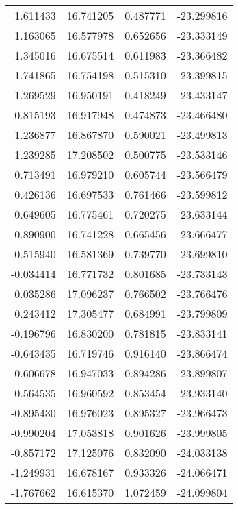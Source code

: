 \begin{tabular}{rrrr}
        1.611433 &        16.741205 &    0.487771 & -23.299816 \\
        1.163065 &        16.577978 &    0.652656 & -23.333149 \\
        1.345016 &        16.675514 &    0.611983 & -23.366482 \\
        1.741865 &        16.754198 &    0.515310 & -23.399815 \\
        1.269529 &        16.950191 &    0.418249 & -23.433147 \\
        0.815193 &        16.917948 &    0.474873 & -23.466480 \\
        1.236877 &        16.867870 &    0.590021 & -23.499813 \\
        1.239285 &        17.208502 &    0.500775 & -23.533146 \\
        0.713491 &        16.979210 &    0.605744 & -23.566479 \\
        0.426136 &        16.697533 &    0.761466 & -23.599812 \\
        0.649605 &        16.775461 &    0.720275 & -23.633144 \\
        0.890900 &        16.741228 &    0.665456 & -23.666477 \\
        0.515940 &        16.581369 &    0.739770 & -23.699810 \\
       -0.034414 &        16.771732 &    0.801685 & -23.733143 \\
        0.035286 &        17.096237 &    0.766502 & -23.766476 \\
        0.243412 &        17.305477 &    0.684991 & -23.799809 \\
       -0.196796 &        16.830200 &    0.781815 & -23.833141 \\
       -0.643435 &        16.719746 &    0.916140 & -23.866474 \\
       -0.606678 &        16.947033 &    0.894286 & -23.899807 \\
       -0.564535 &        16.960592 &    0.853454 & -23.933140 \\
       -0.895430 &        16.976023 &    0.895327 & -23.966473 \\
       -0.990204 &        17.053818 &    0.901626 & -23.999805 \\
       -0.857172 &        17.125076 &    0.832090 & -24.033138 \\
       -1.249931 &        16.678167 &    0.933326 & -24.066471 \\
       -1.767662 &        16.615370 &    1.072459 & -24.099804 \\

\end{tabular}
